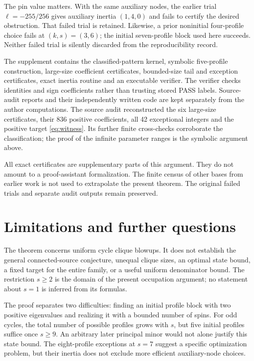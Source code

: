\documentclass[11pt]{article}
\theoremstyle{remark}\newtheorem{remark}[theorem]{Remark}
\begin{document}
The pin value matters. With the same auxiliary nodes, the
earlier trial $\ell=-255/256$ gives auxiliary inertia $(1,4,0)$
and fails to certify the desired obstruction. That failed
trial is retained. Likewise, a prior noninitial four-profile
choice fails at $(k,s)=(3,6)$; the initial seven-profile block
used here succeeds. Neither failed trial is silently discarded
from the reproducibility record.

The supplement contains the classified-pattern kernel, symbolic
five-profile construction, large-size coefficient certificates,
bounded-size tail and exception certificates, exact inertia
routine and an executable verifier. The verifier checks identities
and sign coefficients rather than trusting stored PASS labels.
Source-audit reports and their independently written code are
kept separately from the author computations. The source audit
reconstructed the six large-size certificates, their 836
positive coefficients, all 42 exceptional integers and the
positive target \eqref{eq:witness}. Its further finite
cross-checks corroborate the classification; the proof of the
infinite parameter ranges is the symbolic argument above.

All exact certificates are supplementary parts of this argument.
They do not amount to a proof-assistant formalization.
The finite census of other bases from earlier work is not used
to extrapolate the present theorem. The original failed trials
and separate audit outputs remain preserved.

\section{Limitations and further questions}
The theorem concerns uniform cycle clique blowups.
It does not establish the general connected-source conjecture,
unequal clique sizes, an optimal state bound, a fixed target for
the entire family, or a useful uniform denominator bound.
The restriction $s\ge2$ is the domain of the present occupation
argument; no statement about $s=1$ is inferred from its formulas.

The proof separates two difficulties: finding an initial
profile block with two positive eigenvalues and realizing it
with a bounded number of spins. For odd cycles, the total number
of possible profiles grows with $s$, but five initial profiles
suffice once $s\ge9$. An arbitrary later principal minor would
not alone justify this state bound.
The eight-profile exceptions at $s=7$ suggest a specific
optimization problem, but their inertia does not exclude
more efficient auxiliary-node choices.
\end{document}
